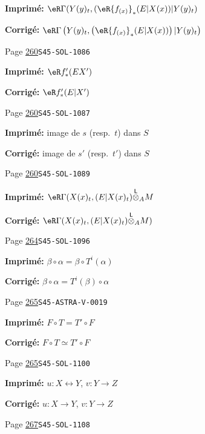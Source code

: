\documentclass[oneside]{book}
\newcommand{\lotimes}{{\overset{\mathsf{L}}{\otimes}}}
\theoremstyle{sga-source}
\theoremstyle{sga-source-dash}
\theoremstyle{sga-source-dotdash}
\theoremstyle{sga-source-number-note-dash}
\theoremstyle{sga-source-note-number-dotdash}
\theoremstyle{sga-source-example-dotdash}
\theoremstyle{sga-source-inline-number}
\theoremstyle{sga-source-bare-number}
\theoremstyle{sga-source}
\begin{document}
\begin{description}
\par\noindent\textbf{Imprimé:} \(\eR\Gamma(Y(y)_t,(\eR {f_{(x)}}_\ast (E|X(x))|Y(y)_t)\)
\par\noindent\textbf{Corrigé:} \(\eR\Gamma\left(Y(y)_t,\left(\eR {f_{(x)}}_\ast (E|X(x))\right)|Y(y)_t\right)\)
\smallskip
\item[\hypertarget{apparatus:FR-0270}{270}] Page \hyperlink{printpage:fr:260}{260}\quad\texttt{S45-SOL-1086}
\par\noindent\textbf{Imprimé:} \(\eR f_\ast'(E X')\)
\par\noindent\textbf{Corrigé:} \(\eR f_\ast'(E|X')\)
\smallskip
\item[\hypertarget{apparatus:FR-0271}{271}] Page \hyperlink{printpage:fr:260}{260}\quad\texttt{S45-SOL-1087}
\par\noindent\textbf{Imprimé:} image de $s$ 
(resp.\ $t$) dans $S$
\par\noindent\textbf{Corrigé:} image de $s'$ 
(resp.\ $t'$) dans $S$
\smallskip
\item[\hypertarget{apparatus:FR-0272}{272}] Page \hyperlink{printpage:fr:260}{260}\quad\texttt{S45-SOL-1089}
\par\noindent\textbf{Imprimé:} \(\eR\Gamma(X(x)_t,(E|X(x)_t)\lotimes_A M\)
\par\noindent\textbf{Corrigé:} \(\eR\Gamma(X(x)_t,(E|X(x)_t)\lotimes_A M)\)
\smallskip
\item[\hypertarget{apparatus:FR-0273}{273}] Page \hyperlink{printpage:fr:264}{264}\quad\texttt{S45-SOL-1096}
\par\noindent\textbf{Imprimé:} \(\beta\circ \alpha = \beta\circ T^i(\alpha)\)
\par\noindent\textbf{Corrigé:} \(\beta\circ \alpha = T^i(\beta)\circ\alpha\)
\smallskip
\item[\hypertarget{apparatus:FR-0274}{274}] Page \hyperlink{printpage:fr:265}{265}\quad\texttt{S45-ASTRA-V-0019}
\par\noindent\textbf{Imprimé:} \(F\circ T = T'\circ F\)
\par\noindent\textbf{Corrigé:} \(F\circ T \simeq T'\circ F\)
\smallskip
\item[\hypertarget{apparatus:FR-0275}{275}] Page \hyperlink{printpage:fr:265}{265}\quad\texttt{S45-SOL-1100}
\par\noindent\textbf{Imprimé:} $u:X\leftrightarrow Y$, $v:Y\to Z$
\par\noindent\textbf{Corrigé:} $u:X\to Y$, $v:Y\to Z$
\smallskip
\item[\hypertarget{apparatus:FR-0276}{276}] Page \hyperlink{printpage:fr:267}{267}\quad\texttt{S45-SOL-1108}

\end{description}
\end{document}
